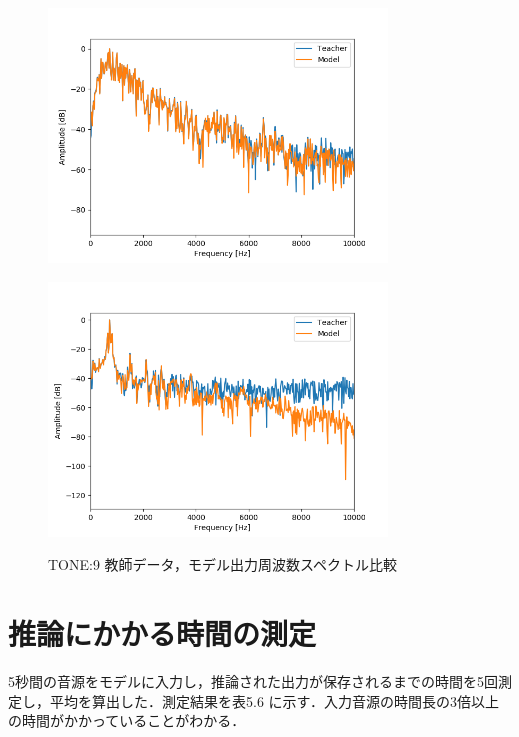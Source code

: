 \documentclass{jreport}		%
\begin{document}
\begin{figure}[htbp]
 \begin{minipage}{0.5\hsize}
 \begin{center}
  \includegraphics[width=90mm]{tone10_fft.png}
 \end{center}
 \label{fig:one}
 \end{minipage}
 \begin{minipage}{0.5\hsize}
 \begin{center}
  \includegraphics[width=90mm]{tone10_fft2.png}
 \end{center}
 \label{fig:two}
 \end{minipage}
 \caption{TONE:9 教師データ，モデル出力周波数スペクトル比較}
\end{figure}

\newpage
\section{推論にかかる時間の測定}
5秒間の音源をモデルに入力し，推論された出力が保存されるまでの時間を5回測定し，平均を算出した．測定結果を表5.6 に示す．入力音源の時間長の3倍以上の時間がかかっていることがわかる．
\end{document}
